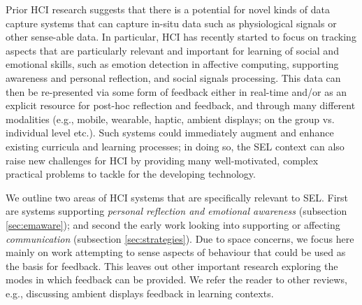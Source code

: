 \documentclass[prodmode,acmtochi]{acmsmall}
\newcommand{\todo}[1]{\textrm{\textrm{\textcolor{LightBlue}{[[#1]]}}}}
\begin{document}
Prior HCI research suggests that there is a potential for novel kinds of data capture systems that can capture in-situ data such as physiological signals or other sense-able data. In particular, HCI has recently started to focus on tracking aspects that are particularly relevant and important for learning of social and emotional skills, such as  emotion detection in affective computing,
supporting awareness and personal reflection, and social signals processing.
This data can then be re-presented via some form of feedback either in real-time and/or as an explicit resource for post-hoc reflection and feedback, and through many different modalities (e.g., mobile, wearable, haptic, ambient displays; on the group vs. individual level etc.). Such systems could immediately augment and enhance existing curricula and learning processes; in doing so, the SEL context can also raise new challenges for HCI by providing many well-motivated, complex practical problems to tackle for the developing technology. 

We outline two areas of HCI systems that are specifically relevant to SEL. First are systems supporting \emph{personal reflection and emotional awareness} (subsection \ref{sec:emaware}); and second the early work looking into supporting or affecting \emph{communication} (subsection \ref{sec:strategies}). Due to space concerns, we focus here mainly on work attempting to sense aspects of behaviour that could be used as the basis for feedback. This leaves out other important research exploring the modes in which feedback can be provided. We refer the reader to other reviews, e.g.,  discussing ambient displays feedback in learning contexts. 

\end{document}
